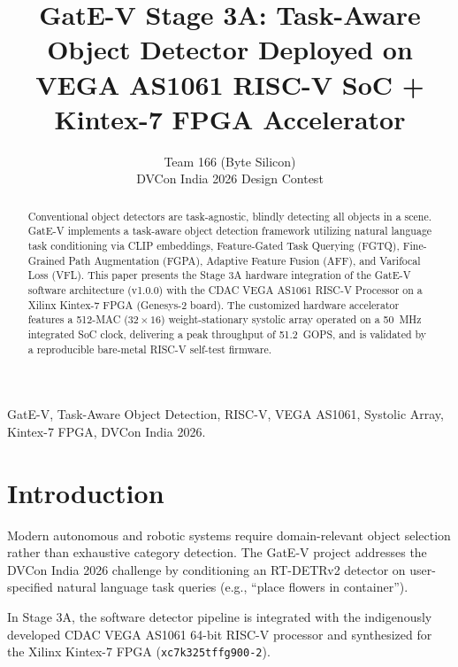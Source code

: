 \documentclass[10pt,journal,compsoc,twocolumn]{IEEEtran}
\begin{document}
\title{GatE-V Stage 3A: Task-Aware Object Detector Deployed on VEGA AS1061 RISC-V SoC + Kintex-7 FPGA Accelerator}

\author{Team 166 (Byte Silicon) \\
DVCon India 2026 Design Contest}


\maketitle

\begin{abstract}
Conventional object detectors are task-agnostic, blindly detecting all objects in a scene. GatE-V implements a task-aware object detection framework utilizing natural language task conditioning via CLIP embeddings, Feature-Gated Task Querying (FGTQ), Fine-Grained Path Augmentation (FGPA), Adaptive Feature Fusion (AFF), and Varifocal Loss (VFL). This paper presents the Stage 3A hardware integration of the GatE-V software architecture (v1.0.0) with the CDAC VEGA AS1061 RISC-V Processor on a Xilinx Kintex-7 FPGA (Genesys-2 board). The customized hardware accelerator features a 512-MAC ($32 \times 16$) weight-stationary systolic array operated on a 50~MHz integrated SoC clock, delivering a peak throughput of 51.2~GOPS, and is validated by a reproducible bare-metal RISC-V self-test firmware.
\end{abstract}

\begin{IEEEkeywords}
GatE-V, Task-Aware Object Detection, RISC-V, VEGA AS1061, Systolic Array, Kintex-7 FPGA, DVCon India 2026.
\end{IEEEkeywords}

\section{Introduction}
Modern autonomous and robotic systems require domain-relevant object selection rather than exhaustive category detection. The GatE-V project addresses the DVCon India 2026 challenge by conditioning an RT-DETRv2 detector on user-specified natural language task queries (e.g., ``place flowers in container'').

In Stage 3A, the software detector pipeline is integrated with the indigenously developed CDAC VEGA AS1061 64-bit RISC-V processor and synthesized for the Xilinx Kintex-7 FPGA (\texttt{xc7k325tffg900-2}).
\end{document}
